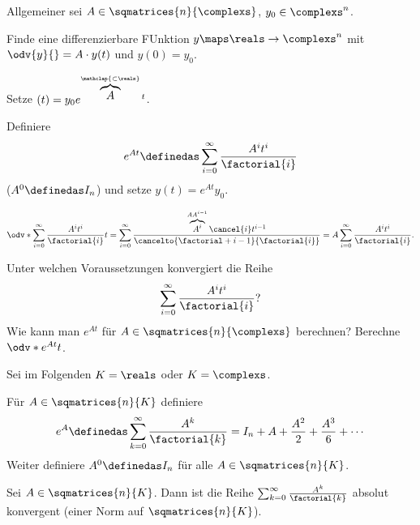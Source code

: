 Allgemeiner sei \( A\in \sqmatrices{n}{\complexs} \), \( y_0\in \complexs^n \). 
\begin{ziel*}
  Finde eine differenzierbare FUnktion \( y\maps \reals\to \complexs^n \) mit \( \odv{y}{}=A\cdot y(t) \) und \( y(0)=y_0 \).
\end{ziel*}
\begin{spezialfall*}[\( n=1 \)]
  Setze \( (t)=y_0 e^{\overbrace{A}^{\mathclap{\subset \reals}}t} \).
\end{spezialfall*}
\begin{idee*}[\( n\geq 1 \)]
  Definiere
  \begin{equation*}
    e^{A t}\definedas \sum_{i=0}^{\infty}\frac{A^i t^i}{\factorial{i}}
  \end{equation*}
  (\( A^0\definedas I_n \)) und setze \( y(t)=e^{A t}y_0 \).
\end{idee*}
\begin{equation}
    \odv*{\sum_{i=0}^{\infty}\frac{A^i t^i}{\factorial{i}}}{t}=\sum_{i=0}^{\infty}\frac{\overbrace{A^i}^{AA^{i-1}}\cancel{i}t^{i-1}}{\cancelto{\factorial+{i-1}}{\factorial{i}}}=A \sum_{i=0}^{\infty}\frac{A^i t^i}{\factorial{i}}.
\end{equation}
\begin{frage*}
  Unter welchen Voraussetzungen konvergiert die Reihe
  \begin{equation*}
    \sum_{i=0}^{\infty}\frac{A^i t^i}{\factorial{i}}?
  \end{equation*}
  \tto Wie kann man \( e^{At} \) für \( A\in \sqmatrices{n}{\complexs} \) berechnen? \tto Berechne \( \odv*{e^{At}}{t} \).
\end{frage*}
Sei im Folgenden \( K=\reals \) oder \( K=\complexs \).
\begin{definition*}
  Für \( A\in \sqmatrices{n}{K} \) definiere 
  \begin{equation*}
    e^{A}\definedas \sum_{k=0}^{\infty}\frac{A^k}{\factorial{k}}=I_n+A+\frac{A^2}{2}+\frac{A^3}{6}+\dotsb
  \end{equation*}
  Weiter definiere \( A^0\definedas I_n \) für alle \( A\in \sqmatrices{n}{K} \).
\end{definition*}
\begin{lemma}\label{exponentialabbildung_matrix_absolut_konvergent}
  Sei \( A\in \sqmatrices{n}{K} \). Dann ist die Reihe \( \sum_{k=0}^{\infty}\frac{A^k}{\factorial{k}} \) absolut konvergent (\bzgl einer Norm auf \( \sqmatrices{n}{K} \)).
\end{lemma}
